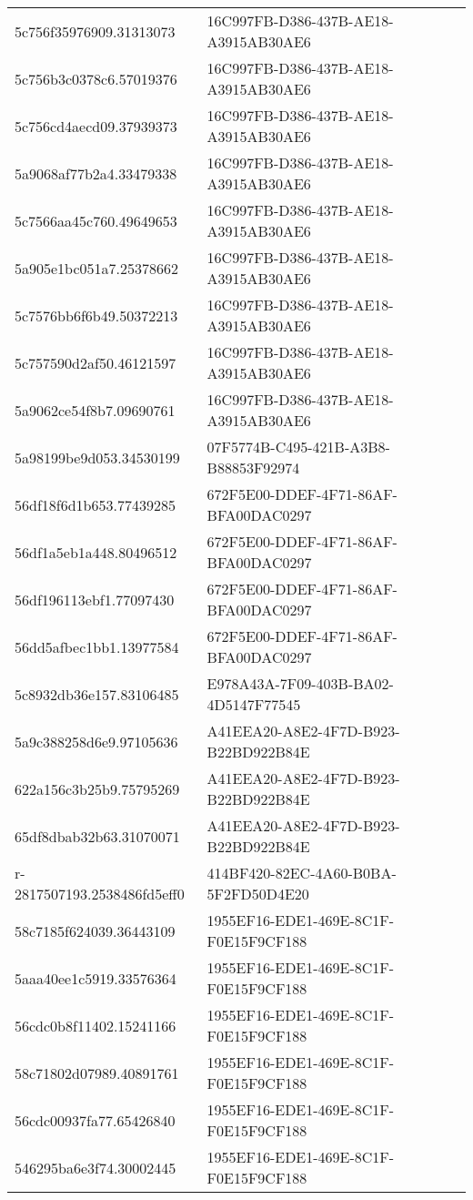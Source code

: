 \begin{tabular}{ll}
5c756f35976909.31313073 & 16C997FB-D386-437B-AE18-A3915AB30AE6 \\
5c756b3c0378c6.57019376 & 16C997FB-D386-437B-AE18-A3915AB30AE6 \\
5c756cd4aecd09.37939373 & 16C997FB-D386-437B-AE18-A3915AB30AE6 \\
5a9068af77b2a4.33479338 & 16C997FB-D386-437B-AE18-A3915AB30AE6 \\
5c7566aa45c760.49649653 & 16C997FB-D386-437B-AE18-A3915AB30AE6 \\
5a905e1bc051a7.25378662 & 16C997FB-D386-437B-AE18-A3915AB30AE6 \\
5c7576bb6f6b49.50372213 & 16C997FB-D386-437B-AE18-A3915AB30AE6 \\
5c757590d2af50.46121597 & 16C997FB-D386-437B-AE18-A3915AB30AE6 \\
5a9062ce54f8b7.09690761 & 16C997FB-D386-437B-AE18-A3915AB30AE6 \\
5a98199be9d053.34530199 & 07F5774B-C495-421B-A3B8-B88853F92974 \\
56df18f6d1b653.77439285 & 672F5E00-DDEF-4F71-86AF-BFA00DAC0297 \\
56df1a5eb1a448.80496512 & 672F5E00-DDEF-4F71-86AF-BFA00DAC0297 \\
56df196113ebf1.77097430 & 672F5E00-DDEF-4F71-86AF-BFA00DAC0297 \\
56dd5afbec1bb1.13977584 & 672F5E00-DDEF-4F71-86AF-BFA00DAC0297 \\
5c8932db36e157.83106485 & E978A43A-7F09-403B-BA02-4D5147F77545 \\
5a9c388258d6e9.97105636 & A41EEA20-A8E2-4F7D-B923-B22BD922B84E \\
622a156c3b25b9.75795269 & A41EEA20-A8E2-4F7D-B923-B22BD922B84E \\
65df8dbab32b63.31070071 & A41EEA20-A8E2-4F7D-B923-B22BD922B84E \\
r-2817507193.2538486fd5eff0 & 414BF420-82EC-4A60-B0BA-5F2FD50D4E20 \\
58c7185f624039.36443109 & 1955EF16-EDE1-469E-8C1F-F0E15F9CF188 \\
5aaa40ee1c5919.33576364 & 1955EF16-EDE1-469E-8C1F-F0E15F9CF188 \\
56cdc0b8f11402.15241166 & 1955EF16-EDE1-469E-8C1F-F0E15F9CF188 \\
58c71802d07989.40891761 & 1955EF16-EDE1-469E-8C1F-F0E15F9CF188 \\
56cdc00937fa77.65426840 & 1955EF16-EDE1-469E-8C1F-F0E15F9CF188 \\
546295ba6e3f74.30002445 & 1955EF16-EDE1-469E-8C1F-F0E15F9CF188 \\

\end{tabular}
